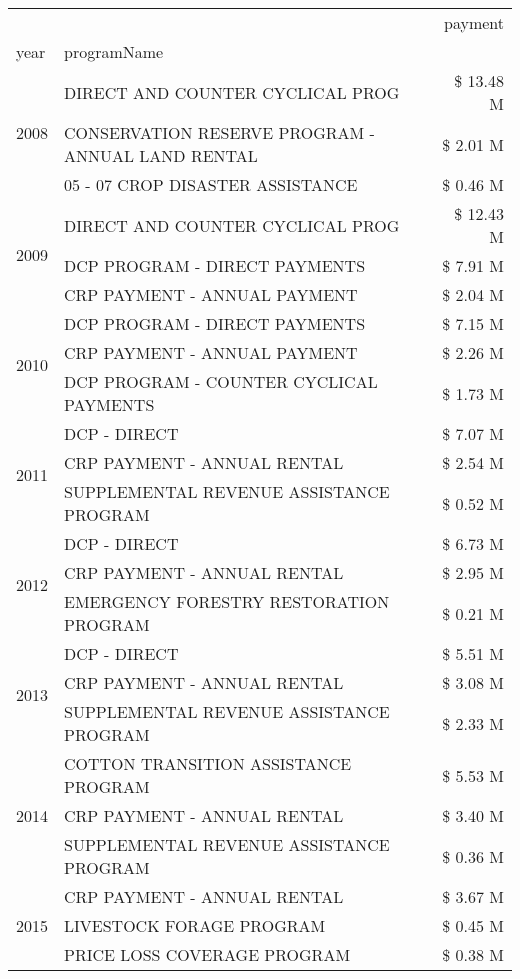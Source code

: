 \begin{tabular}{llr}
\toprule
 &  & payment \\
year & programName &  \\
\midrule
\multirow[t]{3}{*}{2008} & DIRECT AND COUNTER CYCLICAL PROG & \$ 13.48 M \\
 & CONSERVATION RESERVE PROGRAM - ANNUAL LAND RENTAL & \$ 2.01 M \\
 & 05 - 07 CROP DISASTER ASSISTANCE & \$ 0.46 M \\
\cline{1-3}
\multirow[t]{3}{*}{2009} & DIRECT AND COUNTER CYCLICAL PROG & \$ 12.43 M \\
 & DCP PROGRAM - DIRECT PAYMENTS & \$ 7.91 M \\
 & CRP PAYMENT - ANNUAL PAYMENT & \$ 2.04 M \\
\cline{1-3}
\multirow[t]{3}{*}{2010} & DCP PROGRAM - DIRECT PAYMENTS & \$ 7.15 M \\
 & CRP PAYMENT - ANNUAL PAYMENT & \$ 2.26 M \\
 & DCP PROGRAM - COUNTER CYCLICAL PAYMENTS & \$ 1.73 M \\
\cline{1-3}
\multirow[t]{3}{*}{2011} & DCP - DIRECT & \$ 7.07 M \\
 & CRP PAYMENT - ANNUAL RENTAL & \$ 2.54 M \\
 & SUPPLEMENTAL REVENUE ASSISTANCE PROGRAM & \$ 0.52 M \\
\cline{1-3}
\multirow[t]{3}{*}{2012} & DCP - DIRECT & \$ 6.73 M \\
 & CRP PAYMENT - ANNUAL RENTAL & \$ 2.95 M \\
 & EMERGENCY FORESTRY RESTORATION PROGRAM & \$ 0.21 M \\
\cline{1-3}
\multirow[t]{3}{*}{2013} & DCP - DIRECT & \$ 5.51 M \\
 & CRP PAYMENT - ANNUAL RENTAL & \$ 3.08 M \\
 & SUPPLEMENTAL REVENUE ASSISTANCE PROGRAM & \$ 2.33 M \\
\cline{1-3}
\multirow[t]{3}{*}{2014} & COTTON TRANSITION ASSISTANCE PROGRAM & \$ 5.53 M \\
 & CRP PAYMENT - ANNUAL RENTAL & \$ 3.40 M \\
 & SUPPLEMENTAL REVENUE ASSISTANCE PROGRAM & \$ 0.36 M \\
\cline{1-3}
\multirow[t]{3}{*}{2015} & CRP PAYMENT - ANNUAL RENTAL & \$ 3.67 M \\
 & LIVESTOCK FORAGE PROGRAM & \$ 0.45 M \\
 & PRICE LOSS COVERAGE PROGRAM & \$ 0.38 M \\

\end{tabular}
